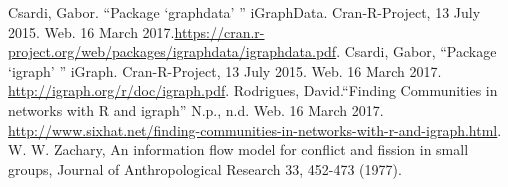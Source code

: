 \documentclass[letterpaper,11pt]{article}
\begin{document}
\clearpage


\begin{thebibliography}{9}
Csardi, Gabor. ``Package `graphdata' '' iGraphData. Cran-R-Project, 13 July 2015. Web. 16 March 2017.\url{https://cran.r-project.org/web/packages/igraphdata/igraphdata.pdf}.
Csardi, Gabor, ``Package `igraph' '' iGraph. Cran-R-Project, 13 July 2015. Web. 16 March 2017. \url{http://igraph.org/r/doc/igraph.pdf}.
Rodrigues, David.``Finding Communities in networks with R and igraph'' N.p., n.d. Web. 16 March 2017. \url{http://www.sixhat.net/finding-communities-in-networks-with-r-and-igraph.html}.
W. W. Zachary, An information flow model for conflict and fission in small groups, Journal of Anthropological Research 33, 452-473 (1977).
\end{thebibliography}
\end{document}
